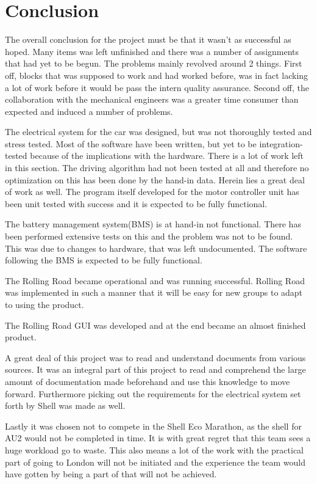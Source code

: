\chapter{Conclusion}
The overall conclusion for the project must be that it wasn't as successful as hoped. Many items was left unfinished and there was a number of assignments that had yet to be begun. The problems mainly revolved around 2 things. First off, blocks that was supposed to work and had worked before, was in fact lacking a lot of work before it would be pass the intern quality assurance. Second off, the collaboration with the mechanical engineers was a greater time consumer than expected and induced a number of problems.   

The electrical system for the car was designed, but was not thoroughly tested and stress tested. Most of the software have been written, but yet to be integration-tested because of the implications with the hardware. There is a lot of work left in this section. The driving algorithm had not been tested at all and therefore no optimization on this has been done by the hand-in data. Herein lies a great deal of work as well. The program itself developed for the motor controller unit has been unit tested with success and it is expected to be fully functional. 

The battery management system(BMS) is at hand-in not functional. There has been performed extensive tests on this and the problem was not to be found. This was due to changes to hardware, that was left undocumented. The software following the BMS is expected to be fully functional. 

The Rolling Road became operational and was running successful. Rolling Road was implemented in such a manner that it will be easy for new groups to adapt to using the product. 

The Rolling Road GUI was developed and at the end became an almost finished product.

A great deal of this project was to read and understand documents from various sources. It was an integral part of this project to read and comprehend the large amount of documentation made beforehand and use this knowledge to move forward. Furthermore picking out the requirements for the electrical system set forth by Shell was made as well.

Lastly it was chosen not to compete in the Shell Eco Marathon, as the shell for AU2 would not be completed in time. It is with great regret that this team sees a huge workload go to waste. This also means a lot of the work with the practical part of going to London will not be initiated and the experience the team would have gotten by being a part of that will not be achieved.
